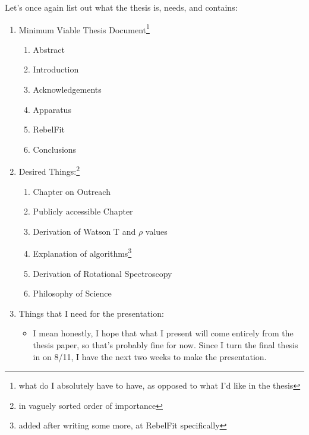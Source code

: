 \documentclass[12pt]{article}
\renewcommand{\,}{\textsuperscript{,}}
\begin{document}
Let's once again list out what the thesis is, needs, and contains:

\begin{enumerate}

\item Minimum Viable Thesis Document\footnote{what do I absolutely have to have, as opposed to what I'd like in the thesis}

\begin{enumerate}

\item Abstract

\item Introduction

\item Acknowledgements

\item Apparatus

\item RebelFit

\item Conclusions

\end{enumerate}

\item Desired Things:\footnote{in vaguely sorted order of importance}

\begin{enumerate}

\item Chapter on Outreach

\item Publicly accessible Chapter

\item Derivation of Watson T and $\rho$ values

\item Explanation of algorithms\footnote{added after writing some more, at RebelFit specifically}

\item Derivation of Rotational Spectroscopy

\item Philosophy of Science

\end{enumerate}

\item Things that I need for the presentation:

\begin{itemize}

\item I mean honestly, I hope that what I present will come entirely from the thesis paper, so that's probably fine for now. Since I turn the final thesis in on 8/11, I have the next two weeks to make the presentation.

\end{itemize}

\end{enumerate}
\end{document}
